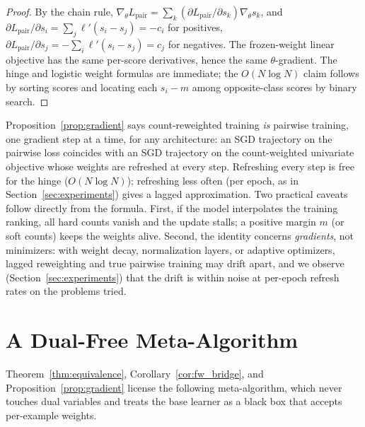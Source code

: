 \documentclass[11pt]{article}
\theoremstyle{remark}
\begin{document}
\begin{proof}
By the chain rule, $\nabla_\theta L_{\mathrm{pair}} = \sum_k
(\partial L_{\mathrm{pair}} / \partial s_k) \nabla_\theta s_k$, and
$\partial L_{\mathrm{pair}} / \partial s_i = \sum_j \ell'(s_i - s_j) = -c_i$
for positives, $\partial L_{\mathrm{pair}} / \partial s_j =
-\sum_i \ell'(s_i - s_j) = c_j$ for negatives. The frozen-weight linear
objective has the same per-score derivatives, hence the same
$\theta$-gradient. The hinge and logistic weight formulas are immediate; the
$O(N \log N)$ claim follows by sorting scores and locating each
$s_i - m$ among opposite-class scores by binary search.
\end{proof}

Proposition~\ref{prop:gradient} says count-reweighted training \emph{is}
pairwise training, one gradient step at a time, for any architecture: an SGD
trajectory on the pairwise loss coincides with an SGD trajectory on the
count-weighted univariate objective whose weights are refreshed at every
step. Refreshing every step is free for the hinge ($O(N\log N)$); refreshing
less often (per epoch, as in Section~\ref{sec:experiments}) gives a lagged
approximation. Two practical caveats follow directly from the formula.
First, if the model interpolates the training ranking, all hard counts
vanish and the update stalls; a positive margin $m$ (or soft counts) keeps
the weights alive. Second, the identity concerns \emph{gradients}, not
minimizers: with weight decay, normalization layers, or adaptive optimizers,
lagged reweighting and true pairwise training may drift apart, and we
observe (Section~\ref{sec:experiments}) that the drift is within noise at
per-epoch refresh rates on the problems tried.

\section{A Dual-Free Meta-Algorithm}
\label{sec:algorithms}

Theorem~\ref{thm:equivalence}, Corollary~\ref{cor:fw_bridge}, and
Proposition~\ref{prop:gradient} license the following meta-algorithm, which
never touches dual variables and treats the base learner as a black box that
accepts per-example weights.
\end{document}

